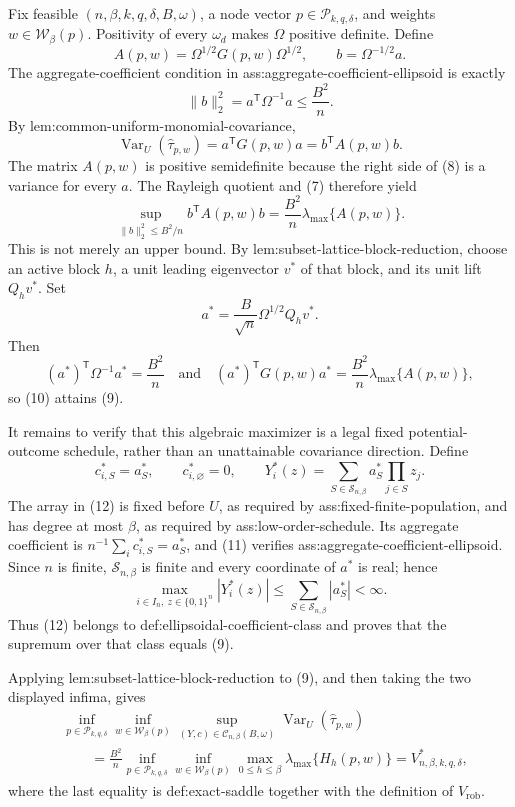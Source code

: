 Fix feasible \((n,\beta,k,q,\delta,B,\omega)\), a node vector \(p\in\mathcal P_{k,q,\delta}\), and weights \(w\in\mathcal W_\beta(p)\).  Positivity of every \(\omega_d\) makes \(\Omega\) positive definite.  Define
\[
A(p,w)=\Omega^{1/2}G(p,w)\Omega^{1/2},
\qquad b=\Omega^{-1/2}a.
\]
The aggregate-coefficient condition in ass:aggregate-coefficient-ellipsoid is exactly
\[
\|b\|_2^2=a^{\mathsf T}\Omega^{-1}a\le \frac{B^2}{n}.
\tag{7}
\]
By lem:common-uniform-monomial-covariance,
\[
\operatorname{Var}_U(\widehat\tau_{p,w})
=a^{\mathsf T}G(p,w)a=b^{\mathsf T}A(p,w)b.
\tag{8}
\]
The matrix \(A(p,w)\) is positive semidefinite because the right side of (8) is a variance for every \(a\).  The Rayleigh quotient and (7) therefore yield
\[
\sup_{\|b\|_2^2\le B^2/n}b^{\mathsf T}A(p,w)b
=\frac{B^2}{n}\lambda_{\max}\{A(p,w)\}.
\tag{9}
\]
This is not merely an upper bound.  By lem:subset-lattice-block-reduction, choose an active block \(h\), a unit leading eigenvector \(v^*\) of that block, and its unit lift \(Q_hv^*\).  Set
\[
a^*=\frac B{\sqrt n}\Omega^{1/2}Q_hv^*.
\tag{10}
\]
Then
\[
(a^*)^{\mathsf T}\Omega^{-1}a^*=\frac{B^2}{n}
\quad\text{and}\quad
(a^*)^{\mathsf T}G(p,w)a^*
=\frac{B^2}{n}\lambda_{\max}\{A(p,w)\},
\tag{11}
\]
so (10) attains (9).

It remains to verify that this algebraic maximizer is a legal fixed potential-outcome schedule, rather than an unattainable covariance direction.  Define
\[
c^*_{i,S}=a^*_S,
\qquad c^*_{i,\varnothing}=0,
\qquad
Y_i^*(z)=\sum_{S\in\mathcal S_{n,\beta}}a^*_S\prod_{j\in S}z_j.
\tag{12}
\]
The array in (12) is fixed before \(U\), as required by ass:fixed-finite-population, and has degree at most \(\beta\), as required by ass:low-order-schedule.  Its aggregate coefficient is
\(n^{-1}\sum_i c^*_{i,S}=a^*_S\), and (11) verifies ass:aggregate-coefficient-ellipsoid.  Since \(n\) is finite, \(\mathcal S_{n,\beta}\) is finite and every coordinate of \(a^*\) is real; hence
\[
\max_{i\in I_n,\ z\in\{0,1\}^n}|Y_i^*(z)|
\le\sum_{S\in\mathcal S_{n,\beta}}|a^*_S|<\infty.
\tag{13}
\]
Thus (12) belongs to def:ellipsoidal-coefficient-class and proves that the supremum over that class equals (9).

Applying lem:subset-lattice-block-reduction to (9), and then taking the two displayed infima, gives
\[
\begin{aligned}
&\inf_{p\in\mathcal P_{k,q,\delta}}
  \inf_{w\in\mathcal W_\beta(p)}
  \sup_{(Y,c)\in\mathcal C_{n,\beta}(B,\omega)}
  \operatorname{Var}_U(\widehat\tau_{p,w})\\
&\qquad=\frac{B^2}{n}
\inf_{p\in\mathcal P_{k,q,\delta}}
\inf_{w\in\mathcal W_\beta(p)}
\max_{0\le h\le\beta}\lambda_{\max}\{H_h(p,w)\}
=V^*_{n,\beta,k,q,\delta},
\end{aligned}
\tag{14}
\]
where the last equality is def:exact-saddle together with the definition of \(V_{\mathrm{rob}}\).

